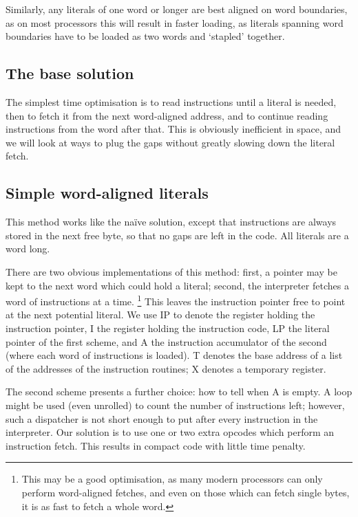 \documentclass{article}
\begin{document}
Similarly, any literals of one word or longer are best aligned on word boundaries,
as on most processors this will result in faster loading, as literals spanning
word boundaries have to be loaded as two words and `stapled' together.


\subsection{The base solution\label{base}}

The simplest time optimisation is to read instructions until a literal is needed,
then to fetch it from the next word-aligned address, and to continue reading instructions
from the word after that. This is obviously inefficient in space, and we will
look at ways to plug the gaps without greatly slowing down the literal fetch.


\subsection{Simple word-aligned literals\label{simple}}

This method works like the na\"ive solution, except that instructions are always
stored in the next free byte, so that no gaps are left in the code. All literals
are a word long.

There are two obvious implementations of this method: first, a pointer may be
kept to the next word which could hold a literal; second, the interpreter fetches
a word of instructions at a time.%
\footnote{This may be a good optimisation, as many modern processors can only perform word-aligned
fetches, and even on those which can fetch single bytes, it is as fast to fetch
a whole word.
} This leaves the instruction pointer free to point at the next potential literal.
We use IP to denote the register holding the instruction pointer, I the register
holding the instruction code, LP the literal pointer of the first scheme, and
A the instruction accumulator of the second (where each word of instructions is
loaded). T denotes the base address of a list of the addresses of the instruction
routines; X denotes a temporary register.

The second scheme presents a further choice: how to tell when A is empty. A loop
might be used (even unrolled) to count the number of instructions left; however,
such a dispatcher is not short enough to put after every instruction in the interpreter.
Our solution is to use one or two extra opcodes which perform an instruction fetch.
This results in compact code with little time penalty.
\end{document}
